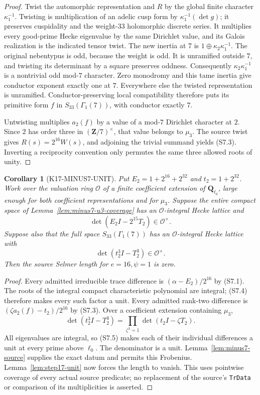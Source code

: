 \documentclass[11pt,a4paper]{article}
\newtheorem{corollary}[theorem]{Corollary}
\theoremstyle{definition}
\begin{document}
\begin{proof}
Twist the automorphic representation and \(R\) by the global
finite character \(\kappa_1^{-1}\). Twisting is multiplication
of an adelic cusp form by \(\kappa_1^{-1}(\det g)\); it preserves
cuspidality and the weight-\(33\) holomorphic discrete series.
It multiplies every good-prime Hecke eigenvalue by the same
Dirichlet value, and its Galois realization is the indicated
tensor twist. The new inertia at \(7\) is
\(1\oplus\kappa_2\kappa_1^{-1}\).
The original nebentypus is odd, because the weight is odd.
It is unramified outside \(7\), and twisting its determinant
by a square preserves oddness. Consequently
\(\kappa_2\kappa_1^{-1}\) is a nontrivial odd mod-\(7\)
character. Zero monodromy and this tame inertia give conductor
exponent exactly one at \(7\). Everywhere else the twisted
representation is unramified. Conductor-preserving local
compatibility therefore puts its primitive form \(f\) in
\(S_{33}(\Gamma_1(7))\), with conductor exactly \(7\).

Untwisting multiplies \(a_2(f)\) by a value of a mod-\(7\)
Dirichlet character at \(2\). Since \(2\) has order three in
\((\mathbf Z/7)^\times\), that value belongs to \(\mu_3\).
The source twist gives
\(R(s)=2^{16}W(s)\), and adjoining the trivial summand yields
(S7.3). Inverting a reciprocity convention only permutes
the same three allowed roots of unity.
\end{proof}

\begin{corollary}[K17-MINUS7-UNIT]\label{cor:minus7-unit}
Put \(E_2=1+2^{16}+2^{32}\) and \(t_2=1+2^{32}\).
Work over the valuation ring \(\mathcal O\) of a finite
coefficient extension of \(\mathbf Q_{\ell_0}\), large enough
for both coefficient representations and for \(\mu_3\).
Suppose the entire compact space of
Lemma~\ref{lem:minus7-u3-coverage} has an
\(\mathcal O\)-integral Hecke lattice and
\[
 \det(E_2I-2^{15}T_2)\in\mathcal O^{\times}.
 \tag{S7.4}
\]
Suppose also that the full space \(S_{33}(\Gamma_1(7))\)
has an \(\mathcal O\)-integral Hecke lattice with
\[
 \det(t_2^3 I-T_2^3)\in\mathcal O^{\times}.
 \tag{S7.5}
\]
Then the source Selmer length for \(e=16,\psi=1\) is zero.
\end{corollary}

\begin{proof}
Every admitted irreducible trace difference is
\((\alpha-E_2)/2^{16}\) by (S7.1).
The roots of the integral compact characteristic polynomial
are integral; (S7.4) therefore makes every such factor a unit.
Every admitted rank-two difference is
\((\zeta a_2(f)-t_2)/2^{16}\) by (S7.3).
Over a coefficient extension containing \(\mu_3\),
\[
 \det(t_2^3I-T_2^3)
   =\prod_{\zeta^3=1}\det(t_2I-\zeta T_2).
\]
All eigenvalues are integral, so (S7.5) makes each of their
individual differences a unit at every prime above \(\ell_0\).
The denominator is a unit. Lemma~\ref{lem:minus7-source}
supplies the exact datum and permits this Frobenius.
Lemma~\ref{lem:step17-unit} now forces the length to vanish.
This uses pointwise coverage of every actual source predicate;
no replacement of the source's \texttt{TrData} or comparison
of its multiplicities is asserted.
\end{proof}
\end{document}

